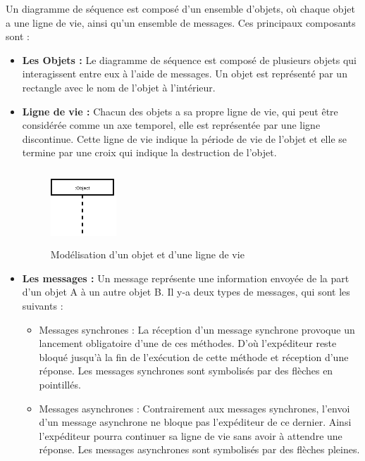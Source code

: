 Un diagramme de séquence est composé d'un ensemble d'objets, où chaque objet a une ligne de vie, ainsi qu'un ensemble de messages. Ces principaux composants sont \cite{UML}:
\begin{itemize}
    \item \textbf{Les Objets :}
    Le diagramme de séquence est composé de plusieurs objets qui interagissent entre eux à l'aide de messages. Un objet est représenté par un rectangle avec le nom de l'objet à l'intérieur.
    \item \textbf{Ligne de vie :}
    Chacun des objets a sa propre ligne de vie, qui peut être considérée comme un axe temporel, elle est représentée par une ligne discontinue. Cette ligne de vie indique la période de vie de l'objet et elle se termine par une croix qui indique la destruction de l'objet.
       \begin{figure}[H]
       	\centering
       	\includegraphics[height=80pt,width=70pt]{img/chapter3/lignevie.png}
       	\caption{Modélisation d'un objet et d'une ligne de vie}
       \end{figure}
    \item \textbf{Les messages :}
     Un message représente une information envoyée de la part d'un objet A à un autre objet B. Il y-a deux types de messages, qui sont les suivants \cite{UML}:
        \begin{itemize}
        \item Messages synchrones : La réception d'un message synchrone provoque un lancement obligatoire d'une de ces méthodes. D'où l'expéditeur reste bloqué jusqu'à la fin de l'exécution de cette méthode et réception d'une réponse. Les messages synchrones sont symbolisés par des flèches en pointillés.
        \item Messages asynchrones : Contrairement aux messages synchrones, l'envoi d'un message asynchrone ne bloque pas l'expéditeur de ce dernier. Ainsi l'expéditeur pourra continuer sa ligne de vie sans avoir à attendre une réponse. Les messages asynchrones sont symbolisés par des flèches pleines.
        \end{itemize}   	
\end{itemize}


